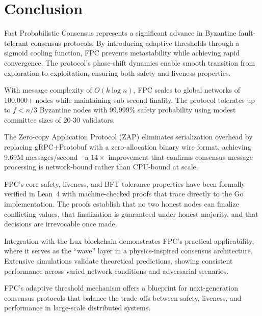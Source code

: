 \section{Conclusion}

\label{sec:conclusion}

Fast Probabilistic Consensus represents a significant advance in Byzantine fault-tolerant consensus protocols. By introducing adaptive thresholds through a sigmoid cooling function, FPC prevents metastability while achieving rapid convergence. The protocol's phase-shift dynamics enable smooth transition from exploration to exploitation, ensuring both safety and liveness properties.

With message complexity of $O(k \log n)$, FPC scales to global networks of 100,000+ nodes while maintaining sub-second finality. The protocol tolerates up to $f < n/3$ Byzantine nodes with 99.999\% safety probability using modest committee sizes of 20-30 validators.

The Zero-copy Application Protocol (ZAP) eliminates serialization overhead by replacing gRPC+Protobuf with a zero-allocation binary wire format, achieving 9.69M messages/second---a $14\times$ improvement that confirms consensus message processing is network-bound rather than CPU-bound at scale.

FPC's core safety, liveness, and BFT tolerance properties have been formally verified in Lean~4 with machine-checked proofs that trace directly to the Go implementation. The proofs establish that no two honest nodes can finalize conflicting values, that finalization is guaranteed under honest majority, and that decisions are irrevocable once made.

Integration with the Lux blockchain demonstrates FPC's practical applicability, where it serves as the ``wave'' layer in a physics-inspired consensus architecture. Extensive simulations validate theoretical predictions, showing consistent performance across varied network conditions and adversarial scenarios.

FPC's adaptive threshold mechanism offers a blueprint for next-generation consensus protocols that balance the trade-offs between safety, liveness, and performance in large-scale distributed systems.

